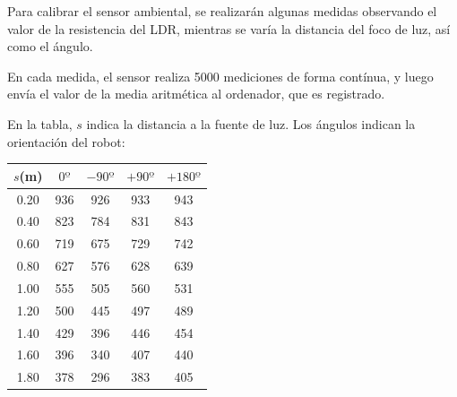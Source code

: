 \documentclass[10pt,a4paper,hidelinks,twocolumn]{article}
\begin{document}
\begin{center}
\end{center}

%


Para calibrar el sensor ambiental, se realizarán algunas medidas observando el 
valor de la resistencia del LDR, mientras se varía la distancia del foco de luz, 
así como el ángulo.

En cada medida, el sensor realiza 5000 mediciones de forma contínua, y luego 
envía el valor de la media aritmética al ordenador, que es registrado.

En la tabla, $s$ indica la distancia a la fuente de luz. Los ángulos indican la 
orientación del robot:

\begin{center}
\begin{tabular}{ | c | c | c | c | c | }
\hline
$s$(m) & $0º$ & $-90º$ & $+90º$ & $+180º$ \\ \hline
0.20 & 936 & 926 & 933 & 943 \\ \hline
0.40 & 823 & 784 & 831 & 843 \\ \hline
0.60 & 719 & 675 & 729 & 742 \\ \hline
0.80 & 627 & 576 & 628 & 639 \\ \hline
1.00 & 555 & 505 & 560 & 531 \\ \hline
1.20 & 500 & 445 & 497 & 489 \\ \hline
1.40 & 429 & 396 & 446 & 454 \\ \hline
1.60 & 396 & 340 & 407 & 440 \\ \hline
1.80 & 378 & 296 & 383 & 405 \\ \hline
\end{tabular}
\end{center}
\end{document}
